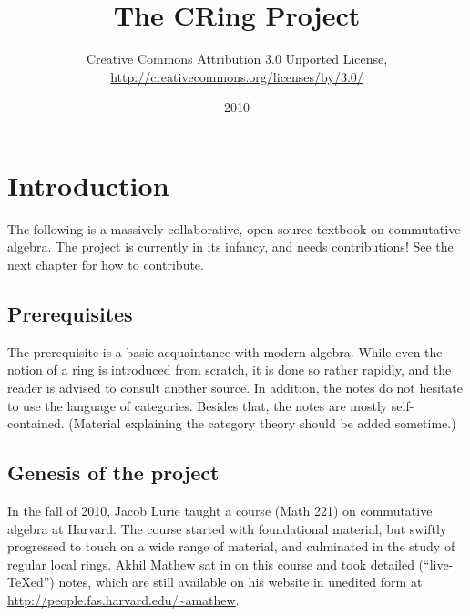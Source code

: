 

\title{The CRing Project}
\author{Creative Commons Attribution 3.0 Unported License, \\
\url{http://creativecommons.org/licenses/by/3.0/} \\ 
}

\date{2010}

\maketitle

\fancyhead{}
\fancyfoot{}
\fancyfoot[C]{\small \textbf{\thepage}}

\tableofcontents

\newpage 


\pagestyle{fancy}



\chapter*{Introduction}

The following is a massively collaborative, open source textbook on
commutative algebra. The project is currently in its infancy, and needs
contributions! See the next chapter for how to contribute.

\section{Prerequisites}
The prerequisite  is a basic acquaintance with modern
algebra. While even the notion of a ring is introduced from scratch, it is
done so rather rapidly, and the reader is advised to consult another source.
In addition, the notes do not hesitate to use the language of categories.
Besides that, the notes are mostly self-contained. (Material explaining the
category theory should be added sometime.) 

\section{Genesis of the project}
In the fall of 2010, Jacob Lurie taught a course (Math 221) on commutative
algebra at Harvard. 
The course started with foundational material, but swiftly progressed to touch on a wide range of
material, and culminated in the study of regular local rings. 
Akhil Mathew sat in on this course and took detailed
(``live-\TeX ed'') notes, which are still available on his website in unedited
form at 
\url{http://people.fas.harvard.edu/~amathew}. 

